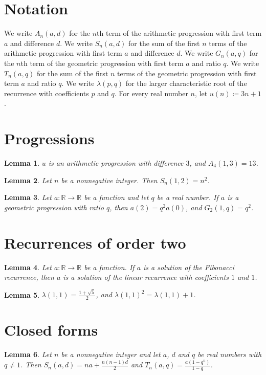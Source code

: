 \documentclass{article}
\newtheorem{lemma}{Lemma}
\begin{document}
\section{Notation}

We write $A_n(a,d)$ for the $n$th term of the arithmetic progression with first term $a$ and difference $d$.
We write $S_n(a,d)$ for the sum of the first $n$ terms of the arithmetic progression with first term $a$ and difference $d$.
We write $G_n(a,q)$ for the $n$th term of the geometric progression with first term $a$ and ratio $q$.
We write $T_n(a,q)$ for the sum of the first $n$ terms of the geometric progression with first term $a$ and ratio $q$.
We write $\lambda(p,q)$ for the larger characteristic root of the recurrence with coefficients $p$ and $q$.
For every real number $n$, let $u(n)\coloneqq 3n+1$.

\section{Progressions}

\begin{lemma}\label{arithmetic}
$u$ is an arithmetic progression with difference $3$, and $A_4(1,3)=13$.
\end{lemma}

\begin{lemma}\label{sum}
Let $n$ be a nonnegative integer. Then $S_n(1,2)=n^2$.
\end{lemma}

\begin{lemma}\label{geometric}
Let $a:\mathbb{R}\to\mathbb{R}$ be a function and let $q$ be a real number. If $a$ is a geometric progression with ratio $q$, then $a(2)=q^2a(0)$, and $G_2(1,q)=q^2$.
\end{lemma}

\section{Recurrences of order two}

\begin{lemma}\label{fibonacci}
Let $a:\mathbb{R}\to\mathbb{R}$ be a function. If $a$ is a solution of the Fibonacci recurrence, then $a$ is a solution of the linear recurrence with coefficients $1$ and $1$.
\end{lemma}

\begin{lemma}\label{root}
$\lambda(1,1)=\frac{1+\sqrt5}{2}$, and $\lambda(1,1)^2=\lambda(1,1)+1$.
\end{lemma}

\section{Closed forms}

\begin{lemma}\label{closed}
Let $n$ be a nonnegative integer and let $a$, $d$ and $q$ be real numbers with $q\neq1$. Then $S_n(a,d)=na+\frac{n(n-1)d}{2}$ and $T_n(a,q)=\frac{a(1-q^n)}{1-q}$.
\end{lemma}
\end{document}
